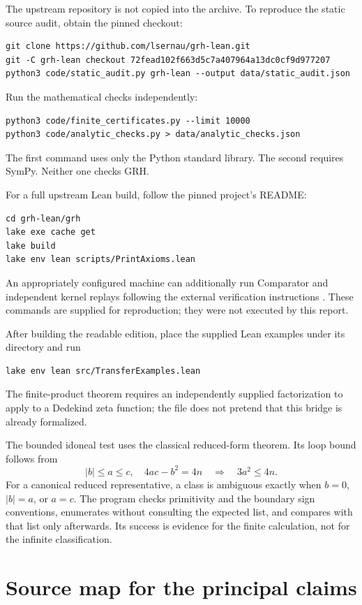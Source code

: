 \documentclass[11pt,letterpaper]{article}
\theoremstyle{definition}
\theoremstyle{remark}
\newcommand{\code}[1]{\texttt{\small\detokenize{#1}}}
\begin{document}
The upstream repository is not copied into the archive.
To reproduce the static source audit, obtain the pinned checkout:
\begin{lstlisting}
git clone https://github.com/lsernau/grh-lean.git
git -C grh-lean checkout 72fead102f663d5c7a407964a13dc0cf9d977207
python3 code/static_audit.py grh-lean --output data/static_audit.json
\end{lstlisting}
Run the mathematical checks independently:
\begin{lstlisting}
python3 code/finite_certificates.py --limit 10000
python3 code/analytic_checks.py > data/analytic_checks.json
\end{lstlisting}
The first command uses only the Python standard library. The
second requires SymPy. Neither one checks GRH.

For a full upstream Lean build, follow the pinned project's README:
\begin{lstlisting}
cd grh-lean/grh
lake exe cache get
lake build
lake env lean scripts/PrintAxioms.lean
\end{lstlisting}
An appropriately configured machine can additionally run
Comparator and independent kernel replays following the
external verification instructions \cite{sutherland,rubinstein}.
These commands are supplied for reproduction; they were not
executed by this report.

After building the readable edition, place the supplied Lean
examples under its \code{src} directory and run
\begin{lstlisting}
lake env lean src/TransferExamples.lean
\end{lstlisting}
The finite-product theorem requires an independently supplied
factorization to apply to a Dedekind zeta function; the file does
not pretend that this bridge is already formalized.

The bounded idoneal test uses the classical reduced-form theorem.
Its loop bound follows from
\[
 |b|\le a\le c,\quad 4ac-b^2=4n
 \quad\Longrightarrow\quad 3a^2\le4n.
\]
For a canonical reduced representative, a class is ambiguous
exactly when \(b=0\), \(|b|=a\), or \(a=c\). The program checks
primitivity and the boundary sign conventions, enumerates
without consulting the expected list, and compares with that
list only afterwards. Its success is evidence for the finite
calculation, not for the infinite classification.

\clearpage
\appendix
\section{Source map for the principal claims}
\end{document}

